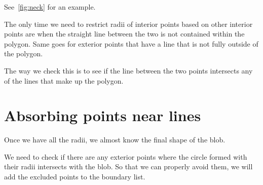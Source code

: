 \documentclass[paper=a4, fontsize=11pt]{scrartcl} %
\numberwithin{equation}{section} %
\numberwithin{figure}{section} %
\numberwithin{table}{section} %
\begin{document}
See~\ref{fig:neck} for an example.

The only time we need to restrict radii of interior points based on other
interior points are when the straight line between the two is not
contained within the polygon.  Same goes for exterior points that have a line
that is not fully outside of the polygon.

The way we check this is to see if the line between the two points intersects
any of the lines that make up the polygon.



\section{Absorbing points near lines}
Once we have all the radii, we almost know the final shape of the blob.

We need to check if there are any exterior points where the circle
formed with their radii intersects with the blob.
So that we can properly avoid them, we will add the excluded points to
the boundary list.
\end{document}
